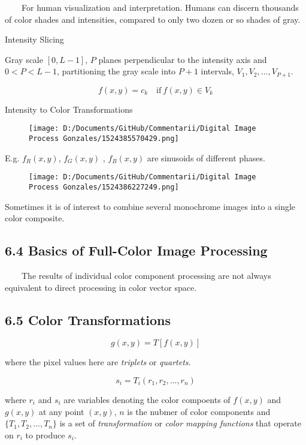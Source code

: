 \documentclass[]{article}
\begin{document}
\(\quad\quad\)For human visualization and interpretation. Humans can
discern thousands of color shades and intensities, compared to only two
dozen or so shades of gray.

Intensity Slicing

Gray scale \([0,L-1]\), \(P\) planes perpendicular to the intensity axis
and \(0<P<L-1\), partitioning the gray scale into \(P+1\) intervals,
\(V_1, V_2,...,V_{P+1}\).

\[f(x,y)=c_k \quad \text{if}\ f(x,y)\in V_k\]

Intensity to Color Transformations

\begin{figure}
\centering
\texttt{[image: D:/Documents/GitHub/Commentarii/Digital Image Process Gonzales/1524385570429.png]}
\caption{}
\end{figure}

E.g. \(f_R(x,y)\), \(f_G(x,y)\) , \(f_B(x,y)\) are sinusoids of
different phases.

\begin{figure}
\centering
\texttt{[image: D:/Documents/GitHub/Commentarii/Digital Image Process Gonzales/1524386227249.png]}
\caption{}
\end{figure}

Sometimes it is of interest to combine several monochrome images into a
single color composite.

\subsection{6.4 Basics of Full-Color Image Processing}\label{header-n66}

\(\quad\quad\)The results of individual color component processing are
not always equivalent to direct processing in color vector space.

\subsection{6.5 Color Transformations}\label{header-n69}

\[g(x,y)=T[f(x,y)]\]

where the pixel values here are \emph{triplets} or \emph{quartets}.

\[s_i=T_i(r_1,r_2,...,r_n)\]

where \(r_i\) and \(s_i\) are variables denoting the color compoents of
\(f(x,y)\) and \(g(x,y)\) at any point \((x,y)\), \(n\) is the nubmer of
color components and \(\{T_1, T_2,..., T_n\}\) is a set of
\emph{transformation} or \emph{color mapping functions} that operate on
\(r_i\) to produce \(s_i\).
\end{document}
